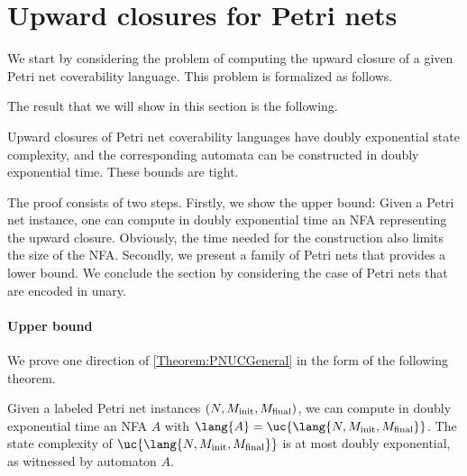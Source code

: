 \documentclass[../../diss.tex]{subfiles}
\begin{document}
\section{Upward closures for Petri nets}%
\label{Section:PNUC}%

We start by considering the problem of computing the upward closure of a given Petri net coverability language.
This problem is formalized as follows.

\begin{compproblem}
    \problemshort{($\PNUC$)}
\end{compproblem}

%
\cheatpagebreak
%

The result that we will show in this section is the following.

\begin{theorem}%
\label{Theorem:PNUCGeneral}%
    Upward closures of Petri net coverability languages have doubly exponential state complexity, and the corresponding automata can be constructed in doubly exponential time.
    These bounds are tight.
\end{theorem}

The proof consists of two steps.
Firstly, we show the upper bound: Given a Petri net instance, one can compute in doubly exponential time an NFA representing the upward closure.
Obviously, the time needed for the construction also limits the size of the NFA.\@
Secondly, we present a family of Petri nets that provides a lower bound.
We conclude the section by considering the case of Petri nets that are encoded in unary.

\paragraph{Upper bound}

We prove one direction of \cref{Theorem:PNUCGeneral} in the form of the following theorem.

\begin{theorem}%
\label{Theorem:PNUC}%
    Given a labeled Petri net instances $(N,M_{\text{init}},M_{\text{final}})$, we can compute in doubly exponential time an NFA $A$ with $\lang{A} = \uc{\lang{N,\Minit,\Mfinal}}$.
    The state complexity of $\uc{\lang{N,\Minit,\Mfinal}}$ is at most doubly exponential, as witnessed by automaton $A$.
\end{theorem}
\end{document}
